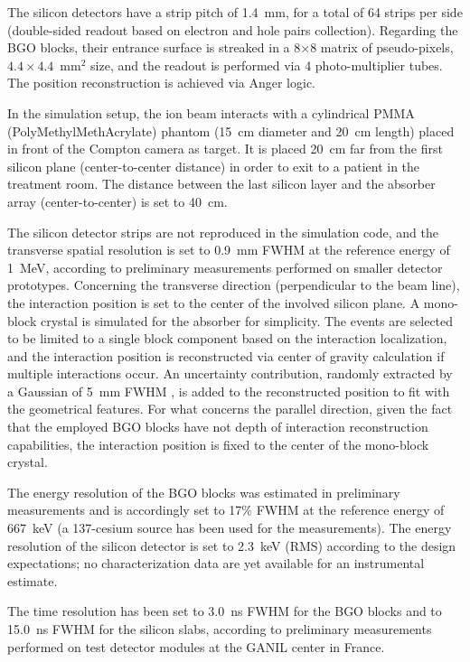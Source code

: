 The silicon detectors have a strip pitch of 1.4~mm, for a total of 64 strips per side (double-sided readout based on electron and hole pairs collection). 
Regarding the BGO blocks, their entrance surface is streaked in a 8$\times$8 matrix of pseudo-pixels, $4.4\times4.4$~mm$^{2}$ size, and the readout is performed via 4 photo-multiplier tubes. The position reconstruction is achieved via Anger logic.

In the simulation setup, the ion beam interacts with a cylindrical PMMA (PolyMethylMethAcrylate) phantom (15~cm diameter and 20~cm length) placed in front of the Compton camera as target. It is placed 20~cm far from the first silicon plane (center-to-center distance) in order to exit to a patient in the treatment room. The distance between the last silicon layer and the absorber array (center-to-center) is set to 40~cm.

The silicon detector strips are not reproduced in the simulation code, and the transverse spatial resolution is set to 0.9~mm FWHM at the reference energy of 1~MeV, according to preliminary measurements performed on smaller detector prototypes. Concerning the transverse direction (perpendicular to the beam line), the interaction position is set to the center of the involved silicon plane. A mono-block crystal is simulated for the absorber for simplicity. The events are selected to be limited to a single block component based on the interaction localization, and the interaction position is reconstructed via center of gravity calculation if multiple interactions occur. An uncertainty contribution, randomly extracted by a Gaussian of 5~mm FWHM , is added to the reconstructed position to fit with the geometrical features. For what concerns the parallel direction, given the fact that the employed BGO blocks have not depth of interaction reconstruction capabilities, the interaction position is fixed to the center of the mono-block crystal.

The energy resolution of the BGO blocks was estimated in preliminary measurements and is accordingly set to 17\% FWHM at the reference energy of 667~keV (a 137-cesium source has been used for the measurements). The energy resolution of the silicon detector is set to 2.3~keV (RMS) according to the design expectations; no characterization data are yet available for an instrumental estimate.

The time resolution has been set to 3.0~ns FWHM for the BGO blocks and to 15.0~ns FWHM for the silicon slabs, according to preliminary measurements performed on test detector modules at the GANIL %
center in France.

